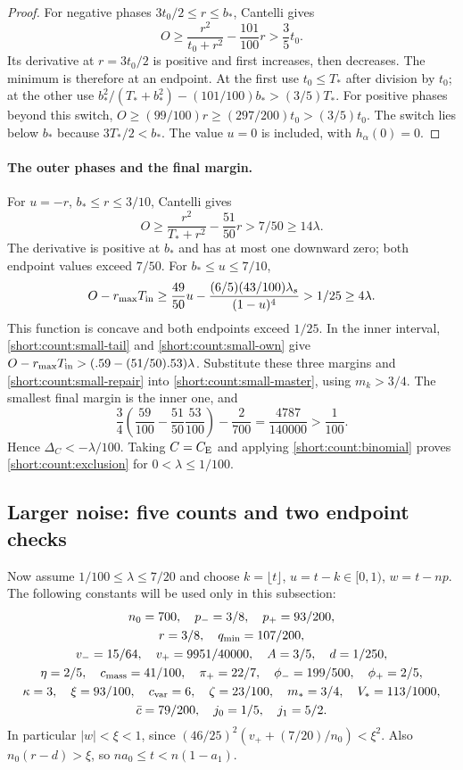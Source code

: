 \begin{proof}
For negative phases $3t_0/2\le r\le b_*$, Cantelli gives
\[
 O\ge\frac{r^2}{t_0+r^2}-\frac{101}{100}r>\frac35t_0.
\]
Its derivative at $r=3t_0/2$ is positive and first increases, then
decreases. The minimum is therefore at an endpoint. At the first use
$t_0\le T_*$ after division by $t_0$; at the other use
$b_*^2/(T_*+b_*^2)-(101/100)b_*>(3/5)T_*$.
For positive phases beyond this switch,
$O\ge(99/100)r\ge(297/200)t_0>(3/5)t_0$.
The switch lies below $b_*$ because $3T_*/2<b_*$.
The value $u=0$ is included, with $h_\alpha(0)=0$.
\end{proof}

\paragraph{The outer phases and the final margin.}
For $u=-r$, $b_*\le r\le3/10$, Cantelli gives
\[
 O\ge\frac{r^2}{T_*+r^2}-\frac{51}{50}r>7/50\ge14\lambda.
\]
The derivative is positive at $b_*$ and has at most one downward zero;
both endpoint values exceed $7/50$. For $b_*\le u\le7/10$,
\[
 O-r_{\max}T_{\rm in}\ge\frac{49}{50}u
          -\frac{(6/5)(43/100)\lambda_s}{(1-u)^4}>1/25\ge4\lambda.
\]
This function is concave and both endpoints exceed $1/25$.
In the inner interval, \eqref{short:count:small-tail} and
\eqref{short:count:small-own} give
$O-r_{\max}T_{\rm in}>(.59-(51/50).53)\lambda$.
Substitute these three margins and \eqref{short:count:small-repair} into
\eqref{short:count:small-master}, using $m_k>3/4$.
The smallest final margin is the inner one, and
\[
 \frac34\left(\frac{59}{100}-\frac{51}{50}\frac{53}{100}\right)
                 -\frac2{700}=\frac{4787}{140000}>\frac1{100}.
\]
Hence $\Delta_C<-\lambda/100$. Taking $C=C_{\mathrm E}$ and applying
\eqref{short:count:binomial} proves \eqref{short:count:exclusion} for
$0<\lambda\le1/100$.

\subsection{Larger noise: five counts and two endpoint checks}
\label{short:count:large}

Now assume $1/100\le\lambda\le7/20$ and choose
$k=\lfloor t\rfloor$, $u=t-k\in[0,1)$, $w=t-np$.
The following constants will be used only in this subsection:
\[
\begin{gathered}
 n_0=700,\quad p_-=3/8,\quad p_+=93/200,\\
 r=3/8,\quad q_{\min}=107/200,\\
 v_-=15/64,\quad v_+=9951/40000,\quad A=3/5,\quad d=1/250,\\
 \eta=2/5,\quad c_{\rm mass}=41/100,\quad\pi_+=22/7,\quad
 \phi_-=199/500,\quad\phi_+=2/5,\\
 \kappa=3,\quad\xi=93/100,\quad c_{\rm var}=6,\quad\zeta=23/100,
 \quad m_*=3/4,\quad V_*=113/1000,\\
 \bar c=79/200,\quad j_0=1/5,\quad j_1=5/2.
\end{gathered}
\]
In particular $|w|<\xi<1$, since
$(46/25)^2(v_++(7/20)/n_0)<\xi^2$.
Also $n_0(r-d)>\xi$, so $na_0\le t<n(1-a_1)$.

